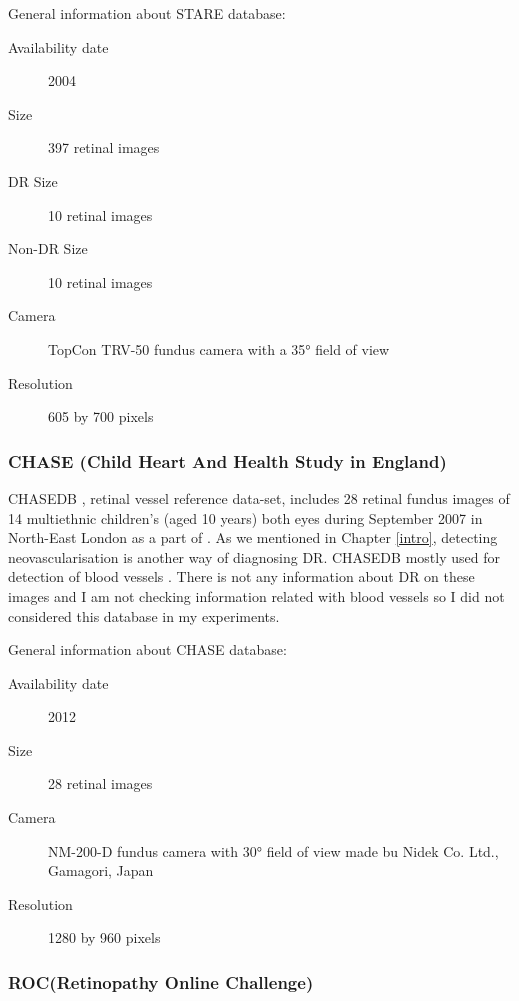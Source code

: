General information about STARE database:

\begin{description}
    \item[Availability date] 2004
    \item[Size] 397 retinal images
    \item[DR Size] 10 retinal images
    \item[Non-DR Size] 10 retinal images
    \item[Camera] TopCon TRV-50 fundus camera with a 35° field of view
    \item[Resolution] 605 by 700 pixels
\end{description}

\subsubsection{CHASE (Child Heart And Health Study in England)}

CHASEDB \citep{Retinal-image-database}, retinal vessel reference data-set, includes 28 retinal fundus images of 14 multiethnic children's (aged 10 years) both eyes during September 2007 in North-East London as a part of \citep{fraz2012ensemble}. As we mentioned in Chapter \ref{intro}, detecting neovascularisation is another way of diagnosing DR. CHASEDB mostly used for detection of blood vessels \citep{liskowski2016segmenting} \citep{elbalaoui2016automatic}. There is not any information about DR on these images and I am not checking information related with blood vessels so I did not considered this database in my experiments.

General information about CHASE database:
\begin{description}
    \item[Availability date] 2012
    \item[Size] 28 retinal images
    \item[Camera] NM-200-D fundus camera with 30° field of view made bu Nidek Co. Ltd., Gamagori, Japan
    \item[Resolution] 1280 by 960 pixels
\end{description}

\subsubsection{ROC(Retinopathy Online Challenge)}

